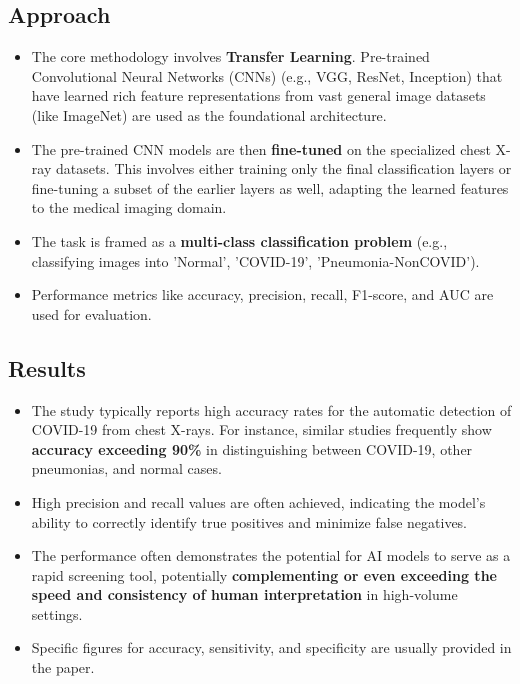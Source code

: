 \subsection*{Approach}
\begin{itemize}
    \item The core methodology involves \textbf{Transfer Learning}. Pre-trained Convolutional Neural Networks (CNNs) (e.g., VGG, ResNet, Inception) that have learned rich feature representations from vast general image datasets (like ImageNet) are used as the foundational architecture.
    \item The pre-trained CNN models are then \textbf{fine-tuned} on the specialized chest X-ray datasets. This involves either training only the final classification layers or fine-tuning a subset of the earlier layers as well, adapting the learned features to the medical imaging domain.
    \item The task is framed as a \textbf{multi-class classification problem} (e.g., classifying images into 'Normal', 'COVID-19', 'Pneumonia-NonCOVID').
    \item Performance metrics like accuracy, precision, recall, F1-score, and AUC are used for evaluation.
\end{itemize}

\subsection*{Results}
\begin{itemize}
    \item The study typically reports high accuracy rates for the automatic detection of COVID-19 from chest X-rays. For instance, similar studies frequently show \textbf{accuracy exceeding 90\%} in distinguishing between COVID-19, other pneumonias, and normal cases.
    \item High precision and recall values are often achieved, indicating the model's ability to correctly identify true positives and minimize false negatives.
    \item The performance often demonstrates the potential for AI models to serve as a rapid screening tool, potentially \textbf{complementing or even exceeding the speed and consistency of human interpretation} in high-volume settings.
\item Specific figures for accuracy, sensitivity, and specificity are usually provided in the paper.
\end{itemize}

